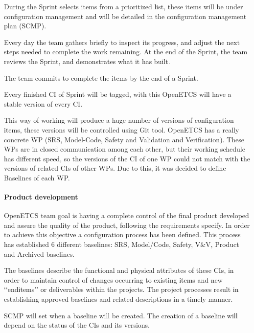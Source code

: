 \documentclass{template/openetcs_article}
\begin{document}
During the Sprint selects items from a prioritized list, these items will be under configuration management and will be detailed in the configuration management plan (SCMP). 

Every day the team gathers briefly to inspect its progress, and adjust the next steps needed to complete the work remaining. At the end of the Sprint, the team reviews the Sprint, and demonstrates what it has built. 

The team commits to complete the items by the end of a Sprint.

Every finished CI of Sprint will be tagged, with this OpenETCS will have a stable version of every CI.

This way of working will produce a huge number of versions of configuration items, these versions will be controlled using Git tool. OpenETCS has a really concrete WP (SRS, Model-Code, Safety and Validation and Verification). These WPs are in closed communication among each other, but their working schedule has different speed, so the versions of the CI of one WP could not match with the versions of related CIs of other WPs. Due to this, it was decided to define Baselines of each WP.


\paragraph{Product development}

OpenETCS team goal is having a complete control of the final product developed and assure the quality of the product, following the requirements specify. In order to achieve this objective a configuration process has been defined. This process has established 6 different baselines: SRS, Model/Code, Safety, V\&V, Product and Archived baselines. 


The baselines describe the functional and physical attributes of these CIs, in order to maintain control of changes occurring to existing items and new `{}`enditems'{}' or deliverables within the projects. The project processes result in establishing approved baselines and related descriptions in a timely manner. 

SCMP will set when a baseline will be created. The creation of a baseline will depend on the status of the CIs and its versions.
\end{document}
